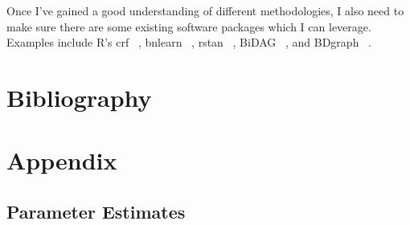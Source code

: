\documentclass[a4paper, 11pt]{report}
\begin{document}
	Once I've gained a good understanding of different methodologies, I also need to make sure there are some existing software packages which I can leverage. Examples include R's crf ~\cite{ling2019}, bnlearn ~\cite{scutari2021}, rstan ~\cite{guo2021}, BiDAG ~\cite{suter2021}, and BDgraph ~\cite{mohammadi2021}.

\chapter*{Bibliography}
\printbibliography

\chapter*{Appendix}
\section*{Parameter Estimates}
\end{document}
